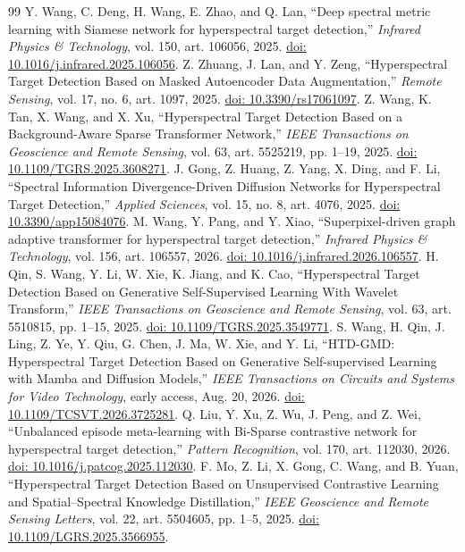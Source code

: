 \documentclass[a4paper,11pt]{article}
\begin{document}
\begin{thebibliography}{99}
 Y. Wang, C. Deng, H. Wang, E. Zhao, and Q. Lan, ``Deep spectral metric learning with Siamese network for hyperspectral target detection,'' \emph{Infrared Physics \& Technology}, vol. 150, art. 106056, 2025. \href{https://doi.org/10.1016/j.infrared.2025.106056}{doi: 10.1016/j.infrared.2025.106056}.
 Z. Zhuang, J. Lan, and Y. Zeng, ``Hyperspectral Target Detection Based on Masked Autoencoder Data Augmentation,'' \emph{Remote Sensing}, vol. 17, no. 6, art. 1097, 2025. \href{https://doi.org/10.3390/rs17061097}{doi: 10.3390/rs17061097}.
 Z. Wang, K. Tan, X. Wang, and X. Xu, ``Hyperspectral Target Detection Based on a Background-Aware Sparse Transformer Network,'' \emph{IEEE Transactions on Geoscience and Remote Sensing}, vol. 63, art. 5525219, pp. 1--19, 2025. \href{https://doi.org/10.1109/TGRS.2025.3608271}{doi: 10.1109/TGRS.2025.3608271}.
 J. Gong, Z. Huang, Z. Yang, X. Ding, and F. Li, ``Spectral Information Divergence-Driven Diffusion Networks for Hyperspectral Target Detection,'' \emph{Applied Sciences}, vol. 15, no. 8, art. 4076, 2025. \href{https://doi.org/10.3390/app15084076}{doi: 10.3390/app15084076}.
 M. Wang, Y. Pang, and Y. Xiao, ``Superpixel-driven graph adaptive transformer for hyperspectral target detection,'' \emph{Infrared Physics \& Technology}, vol. 156, art. 106557, 2026. \href{https://doi.org/10.1016/j.infrared.2026.106557}{doi: 10.1016/j.infrared.2026.106557}.
 H. Qin, S. Wang, Y. Li, W. Xie, K. Jiang, and K. Cao, ``Hyperspectral Target Detection Based on Generative Self-Supervised Learning With Wavelet Transform,'' \emph{IEEE Transactions on Geoscience and Remote Sensing}, vol. 63, art. 5510815, pp. 1--15, 2025. \href{https://doi.org/10.1109/TGRS.2025.3549771}{doi: 10.1109/TGRS.2025.3549771}.
 S. Wang, H. Qin, J. Ling, Z. Ye, Y. Qiu, G. Chen, J. Ma, W. Xie, and Y. Li, ``HTD-GMD: Hyperspectral Target Detection Based on Generative Self-supervised Learning with Mamba and Diffusion Models,'' \emph{IEEE Transactions on Circuits and Systems for Video Technology}, early access, Aug. 20, 2026. \href{https://doi.org/10.1109/TCSVT.2026.3725281}{doi: 10.1109/TCSVT.2026.3725281}.
 Q. Liu, Y. Xu, Z. Wu, J. Peng, and Z. Wei, ``Unbalanced episode meta-learning with Bi-Sparse contrastive network for hyperspectral target detection,'' \emph{Pattern Recognition}, vol. 170, art. 112030, 2026. \href{https://doi.org/10.1016/j.patcog.2025.112030}{doi: 10.1016/j.patcog.2025.112030}.
 F. Mo, Z. Li, X. Gong, C. Wang, and B. Yuan, ``Hyperspectral Target Detection Based on Unsupervised Contrastive Learning and Spatial--Spectral Knowledge Distillation,'' \emph{IEEE Geoscience and Remote Sensing Letters}, vol. 22, art. 5504605, pp. 1--5, 2025. \href{https://doi.org/10.1109/LGRS.2025.3566955}{doi: 10.1109/LGRS.2025.3566955}.

\end{thebibliography}
\end{document}
